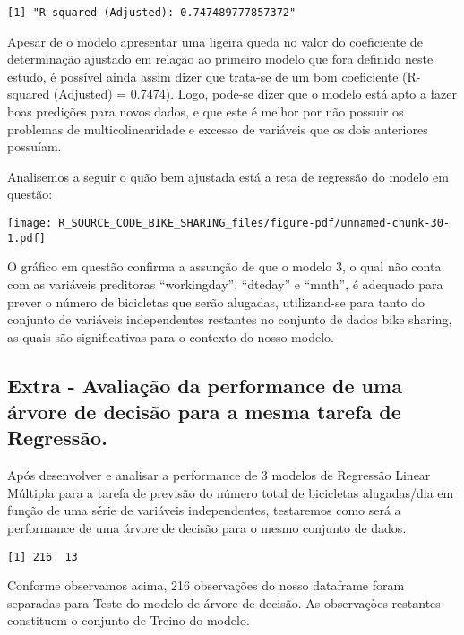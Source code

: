 \documentclass[
  letterpaper,
  DIV=11,
  numbers=noendperiod]{scrartcl}
\begin{document}
\begin{verbatim}
[1] "R-squared (Adjusted): 0.747489777857372"
\end{verbatim}

Apesar de o modelo apresentar uma ligeira queda no valor do coeficiente
de determinação ajustado em relação ao primeiro modelo que fora definido
neste estudo, é possível ainda assim dizer que trata-se de um bom
coeficiente (R-squared (Adjusted) = 0.7474). Logo, pode-se dizer que o
modelo está apto a fazer boas predições para novos dados, e que este é
melhor por não possuir os problemas de multicolinearidade e excesso de
variáveis que os dois anteriores possuíam.

Analisemos a seguir o quão bem ajustada está a reta de regressão do
modelo em questão:

\begin{center}
\texttt{[image: R\_SOURCE\_CODE\_BIKE\_SHARING\_files/figure-pdf/unnamed-chunk-30-1.pdf]}
\end{center}

O gráfico em questão confirma a assunção de que o modelo 3, o qual não
conta com as variáveis preditoras ``workingday'', ``dteday'' e ``mnth'',
é adequado para prever o número de bicicletas que serão alugadas,
utilizand-se para tanto do conjunto de variáveis independentes restantes
no conjunto de dados bike sharing, as quais são significativas para o
contexto do nosso modelo.

\subsection{Extra - Avaliação da performance de uma árvore de decisão
para a mesma tarefa de
Regressão.}\label{extra---avaliauxe7uxe3o-da-performance-de-uma-uxe1rvore-de-decisuxe3o-para-a-mesma-tarefa-de-regressuxe3o.}

Após desenvolver e analisar a performance de 3 modelos de Regressão
Linear Múltipla para a tarefa de previsão do número total de bicicletas
alugadas/dia em função de uma série de variáveis independentes,
testaremos como será a performance de uma árvore de decisão para o mesmo
conjunto de dados.

\begin{verbatim}
[1] 216  13
\end{verbatim}

Conforme observamos acima, 216 observações do nosso dataframe foram
separadas para Teste do modelo de árvore de decisão. As observaçòes
restantes constituem o conjunto de Treino do modelo.
\end{document}
